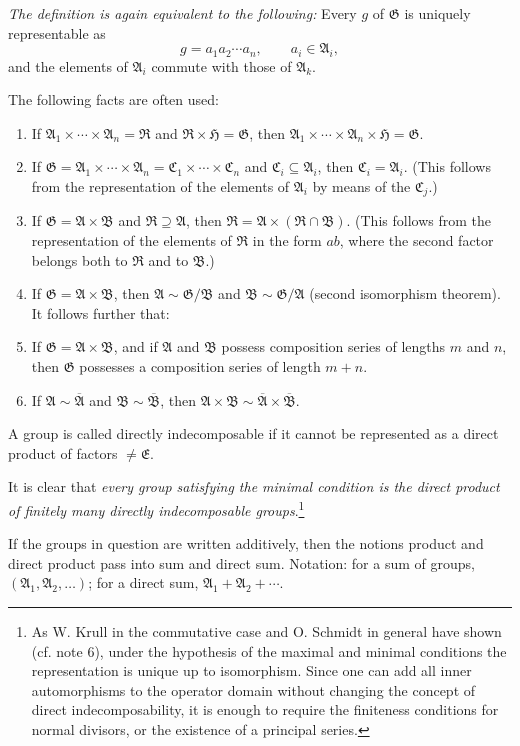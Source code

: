 \documentclass[11pt]{article}
\providecommand{\mG}{\mathfrak{G}}
\providecommand{\mA}{\mathfrak{A}}
\providecommand{\mB}{\mathfrak{B}}
\providecommand{\mC}{\mathfrak{C}}
\providecommand{\mE}{\mathfrak{E}}
\providecommand{\mH}{\mathfrak{H}}
\providecommand{\mR}{\mathfrak{R}}
\begin{document}
\emph{The definition is again equivalent to the following:} Every $g$ of $\mG$ is uniquely representable as
\[
        g=a_1a_2\cdots a_n,\qquad a_i\in\mA_i,
\]
and the elements of $\mA_i$ commute with those of $\mA_k$.

The following facts are often used:
\begin{enumerate}
\item If $\mA_1\times\cdots\times\mA_n=\mR$ and $\mR\times\mH=\mG$, then $\mA_1\times\cdots\times\mA_n\times\mH=\mG$.
\item If $\mG=\mA_1\times\cdots\times\mA_n=\mC_1\times\cdots\times\mC_n$ and $\mC_i\subseteq\mA_i$, then $\mC_i=\mA_i$. (This follows from the representation of the elements of $\mA_i$ by means of the $\mC_j$.)
\item If $\mG=\mA\times\mB$ and $\mR\supseteq\mA$, then $\mR=\mA\times(\mR\cap\mB)$. (This follows from the representation of the elements of $\mR$ in the form $ab$, where the second factor belongs both to $\mR$ and to $\mB$.)
\item If $\mG=\mA\times\mB$, then $\mA\sim\mG/\mB$ and $\mB\sim\mG/\mA$ (second isomorphism theorem). It follows further that:
\item If $\mG=\mA\times\mB$, and if $\mA$ and $\mB$ possess composition series of lengths $m$ and $n$, then $\mG$ possesses a composition series of length $m+n$.
\item If $\mA\sim\overline{\mA}$ and $\mB\sim\overline{\mB}$, then $\mA\times\mB\sim\overline{\mA}\times\overline{\mB}$.
\end{enumerate}
A group is called directly indecomposable if it cannot be represented as a direct product of factors $\ne\mE$.

It is clear that \emph{every group satisfying the minimal condition is the direct product of finitely many directly indecomposable groups}.\footnote{As W. Krull in the commutative case and O. Schmidt in general have shown (cf. note 6), under the hypothesis of the maximal and minimal conditions the representation is unique up to isomorphism. Since one can add all inner automorphisms to the operator domain without changing the concept of direct indecomposability, it is enough to require the finiteness conditions for normal divisors, or the existence of a principal series.}

If the groups in question are written additively, then the notions product and direct product pass into sum and direct sum. Notation: for a sum of groups, $(\mA_1,\mA_2,\ldots)$; for a direct sum, $\mA_1+\mA_2+\cdots$.
\end{document}
